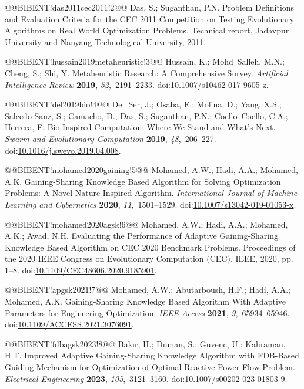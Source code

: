 \documentclass[10pt,a4paper]{article}
\begin{document}
@@BIBENT!das2011cec2011!2@@ Das, S.; Suganthan, P.N. Problem Definitions and Evaluation Criteria for the {CEC} 2011 Competition on Testing Evolutionary Algorithms on Real World Optimization Problems. Technical report, Jadavpur University and Nanyang Technological University, 2011.

@@BIBENT!hussain2019metaheuristic!3@@ Hussain, K.; Mohd~Salleh, M.N.; Cheng, S.; Shi, Y. Metaheuristic Research: A Comprehensive Survey. \emph{Artificial Intelligence Review} \textbf{2019}, \emph{52},~2191--2233. doi:{\href{https://doi.org/10.1007/s10462-017-9605-z}{10.1007/s10462-017-9605-z}}.

@@BIBENT!del2019bio!4@@ Del~Ser, J.; Osaba, E.; Molina, D.; Yang, X.S.; Salcedo-Sanz, S.; Camacho, D.; Das, S.; Suganthan, P.N.; Coello~Coello, C.A.; Herrera, F. Bio-Inspired Computation: Where We Stand and What's Next. \emph{Swarm and Evolutionary Computation} \textbf{2019}, \emph{48},~206--227. doi:{\href{https://doi.org/10.1016/j.swevo.2019.04.008}{10.1016/j.swevo.2019.04.008}}.

@@BIBENT!mohamed2020gaining!5@@ Mohamed, A.W.; Hadi, A.A.; Mohamed, A.K. Gaining-Sharing Knowledge Based Algorithm for Solving Optimization Problems: A Novel Nature-Inspired Algorithm. \emph{International Journal of Machine Learning and Cybernetics} \textbf{2020}, \emph{11},~1501--1529. doi:{\href{https://doi.org/10.1007/s13042-019-01053-x}{10.1007/s13042-019-01053-x}}.

@@BIBENT!mohamed2020agsk!6@@ Mohamed, A.W.; Hadi, A.A.; Mohamed, A.K.; Awad, N.H. Evaluating the Performance of Adaptive Gaining-Sharing Knowledge Based Algorithm on {CEC} 2020 Benchmark Problems. Proceedings of the 2020 IEEE Congress on Evolutionary Computation (CEC). IEEE, 2020, pp. 1--8. doi:{\href{https://doi.org/10.1109/CEC48606.2020.9185901}{10.1109/CEC48606.2020.9185901}}.

@@BIBENT!apgsk2021!7@@ Mohamed, A.W.; Abutarboush, H.F.; Hadi, A.A.; Mohamed, A.K. Gaining-Sharing Knowledge Based Algorithm With Adaptive Parameters for Engineering Optimization. \emph{IEEE Access} \textbf{2021}, \emph{9},~65934--65946. doi:{\href{https://doi.org/10.1109/ACCESS.2021.3076091}{10.1109/ACCESS.2021.3076091}}.

@@BIBENT!fdbagsk2023!8@@ Bak{\i}r, H.; Duman, S.; Guvenc, U.; Kahraman, H.T. Improved Adaptive Gaining-Sharing Knowledge Algorithm with {FDB}-Based Guiding Mechanism for Optimization of Optimal Reactive Power Flow Problem. \emph{Electrical Engineering} \textbf{2023}, \emph{105},~3121--3160. doi:{\href{https://doi.org/10.1007/s00202-023-01803-9}{10.1007/s00202-023-01803-9}}.
\end{document}
